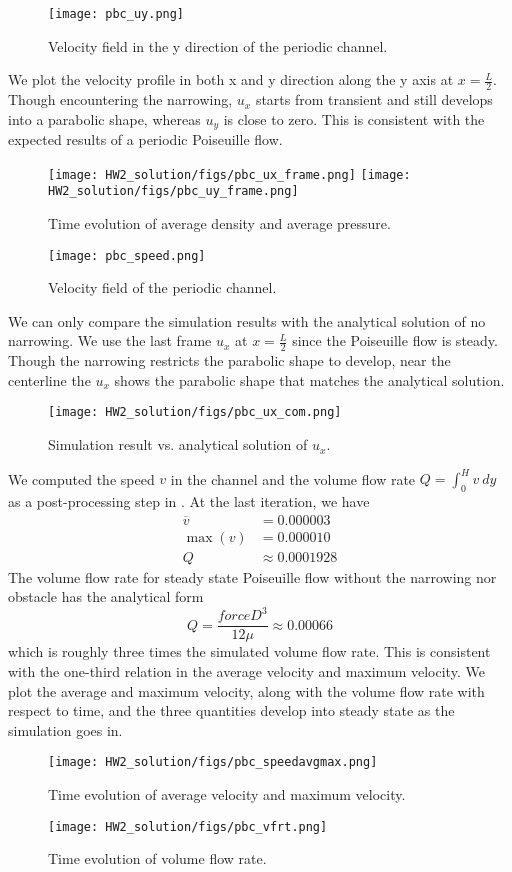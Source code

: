 \begin{figure}[H]
    \centering
    \texttt{[image: pbc\_uy.png]}
    \caption{Velocity field in the y direction of the periodic channel.}
\end{figure}

We plot the velocity profile in both x and y direction along the y axis at $x=\frac{L}{2}$. Though encountering the narrowing, $u_x$ starts from transient and still develops into a parabolic shape, whereas $u_y$ is close to zero. This is consistent with the expected results of a periodic Poiseuille flow.
\begin{figure}[H]
    \centering
    \texttt{[image: HW2\_solution/figs/pbc\_ux\_frame.png]}
    \texttt{[image: HW2\_solution/figs/pbc\_uy\_frame.png]}
    \caption{Time evolution of average density and average pressure.}
\end{figure}

\begin{figure}[H]
    \centering
    \texttt{[image: pbc\_speed.png]}
    \caption{Velocity field of the periodic channel.}
\end{figure}
We can only compare the simulation results with the analytical solution of no narrowing. We use the last frame $u_x$ at $x=\frac{L}{2}$ since the Poiseuille flow is steady. Though the narrowing restricts the parabolic shape to develop, near the centerline the $u_x$ shows the parabolic shape that matches the analytical solution.
\begin{figure}[H]
    \centering
    \texttt{[image: HW2\_solution/figs/pbc\_ux\_com.png]}
    \caption{Simulation result vs. analytical solution of $u_x$.}
\end{figure}


We computed the speed $v$ in the channel and the volume flow rate $Q = \int_0^H v \: dy$ as a post-processing step in . At the last iteration, we have
\begin{align*}
    \overline{v} &= 0.000003 \\
    \max(v) &= 0.000010 \\
    Q &\approx 0.0001928
\end{align*}
The volume flow rate for steady state Poiseuille flow without the narrowing nor obstacle has the analytical form
$$Q = \frac{force D^3}{12\mu} \approx 0.00066$$
which is roughly three times the simulated volume flow rate. This is consistent with the one-third relation in the average velocity and maximum velocity. We plot the average and maximum velocity, along with the volume flow rate with respect to time, and the three quantities develop into steady state as the simulation goes in.
\begin{figure}[H]
    \centering
    \texttt{[image: HW2\_solution/figs/pbc\_speedavgmax.png]}
    \caption{Time evolution of average velocity and maximum velocity.}
    \texttt{[image: HW2\_solution/figs/pbc\_vfrt.png]}
    \caption{Time evolution of volume flow rate.}
\end{figure}






